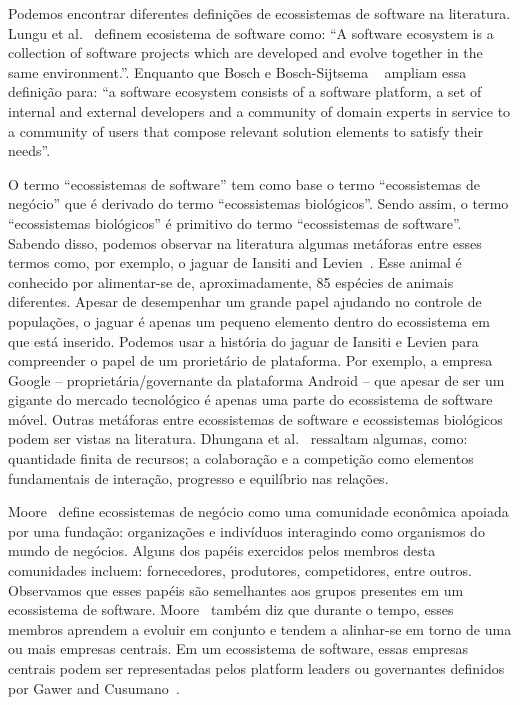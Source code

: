 \documentclass[conference]{IEEEtran}
\begin{document}
Podemos encontrar diferentes definições de ecossistemas de software na literatura. Lungu et al.~\cite{Lungu2010264} definem ecosistema de software como: “A software ecosystem is a collection of software projects which are developed and evolve together in the same environment.”. Enquanto que Bosch e Bosch-Sijtsema ~\cite{Bosch201067} ampliam essa definição para: “a software ecosystem consists of a software platform, a set of internal and external developers and a community of domain experts in service to a community of users that compose relevant solution elements to satisfy their needs”.  

O termo “ecossistemas de software” tem como base o termo “ecossistemas de negócio” que é derivado do termo “ecossistemas biológicos”. Sendo assim, o termo “ecossistemas biológicos” é primitivo do termo “ecossistemas de software”. Sabendo disso, podemos observar na literatura algumas metáforas entre esses termos como, por exemplo, o jaguar de Iansiti and Levien~\cite{Iansiti2004}. Esse animal é conhecido por alimentar-se de, aproximadamente, 85 espécies de animais diferentes. Apesar de desempenhar um grande papel ajudando no controle de populações, o jaguar é apenas um pequeno elemento dentro do ecossistema em que está inserido. Podemos usar a história do jaguar de Iansiti e Levien para compreender o papel de um prorietário de plataforma. Por exemplo, a empresa Google -- proprietária/governante da plataforma Android -- que apesar de ser um gigante do mercado tecnológico é apenas uma parte do ecossistema de software móvel. Outras metáforas entre ecossistemas de software e ecossistemas biológicos podem ser vistas na literatura. Dhungana et al.~\cite{Dhungana2010} ressaltam algumas, como: quantidade finita de recursos; a colaboração e a competição como elementos fundamentais de interação, progresso e equilíbrio nas relações. 

Moore~\cite{Moore1996} define ecossistemas de negócio como uma comunidade econômica apoiada por uma fundação: organizações e indivíduos interagindo como organismos do mundo de negócios. Alguns dos papéis exercidos pelos membros desta comunidades incluem: fornecedores, produtores, competidores, entre outros. Observamos que esses papéis são semelhantes aos grupos presentes em um ecossistema de software. Moore~\cite{Moore1996} também diz que durante o tempo, esses membros aprendem a evoluir em conjunto e tendem a alinhar-se em torno de uma ou mais empresas centrais. Em um ecossistema de software, essas empresas centrais podem ser representadas pelos platform leaders ou governantes definidos por Gawer and Cusumano~\cite{Gawer2002}.
\end{document}
